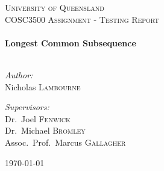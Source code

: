 \begin{titlepage}
\begin{center}

\textsc{\LARGE University of Queensland}\\[1.5cm]
\textsc{\Large COSC3500 Assignment - Testing Report}\\[0.5cm]

\HRule \\[0.4cm]
{\huge \bfseries Longest Common Subsequence\\[0.4cm]}
\HRule \\[1.5cm]

\begin{minipage}{0.4\textwidth}
\begin{flushleft} \large
\emph{Author:}\\
Nicholas \textsc{Lambourne}
\end{flushleft}
\end{minipage}
\begin{minipage}{0.4\textwidth}
\begin{flushright} \large
\emph{Supervisors:} \\
Dr.~Joel \textsc{Fenwick} \\
Dr.~Michael \textsc{Bromley} \\
Assoc.~Prof.~Marcus \textsc{Gallagher}
\end{flushright}
\end{minipage}

\vfill

{\large \today}

\end{center}
\end{titlepage}
